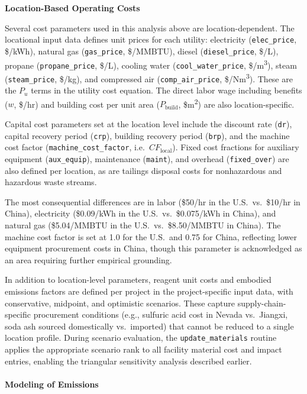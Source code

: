 \medskip
\noindent\textbf{Location-Based Operating Costs}\quad

Several cost parameters used in this analysis above are location-dependent. The locational input data defines unit prices for each utility: electricity (\texttt{elec\_price}, \$/kWh), natural gas (\texttt{gas\_price}, \$/MMBTU), diesel (\texttt{diesel\_price}, \$/L), propane (\texttt{propane\_price}, \$/L), cooling water (\texttt{cool\_water\_price}, \$/\si{m^3}), steam (\texttt{steam\_price}, \$/kg), and compressed air (\texttt{comp\_air\_price}, \$/\si{Nm^3}). These are the $P_u$ terms in the utility cost equation. The direct labor wage including benefits ($w$, \$/hr) and building cost per unit area ($P_{\text{build}}$, \$\si{m^2}) are also location-specific.

Capital cost parameters set at the location level include the discount rate (\texttt{dr}), capital recovery period (\texttt{crp}), building recovery period (\texttt{brp}), and the machine cost factor (\texttt{machine\_cost\_factor}, i.e.\ $CF_{\text{local}}$). Fixed cost fractions for auxiliary equipment (\texttt{aux\_equip}), maintenance (\texttt{maint}), and overhead (\texttt{fixed\_over}) are also defined per location, as are tailings disposal costs for nonhazardous and hazardous waste streams.

The most consequential differences are in labor (\$50/hr in the U.S.\ vs.\ \$10/hr in China), electricity (\$0.09/kWh in the U.S.\ vs.\ \$0.075/kWh in China), and natural gas (\$5.04/MMBTU in the U.S.\ vs.\ \$8.50/MMBTU in China). The machine cost factor is set at 1.0 for the U.S.\ and 0.75 for China, reflecting lower equipment procurement costs in China, though this parameter is acknowledged as an area requiring further empirical grounding.

In addition to location-level parameters, reagent unit costs and embodied emissions factors are defined per project in the project-specific input data, with conservative, midpoint, and optimistic scenarios. These capture supply-chain-specific procurement conditions (e.g., sulfuric acid cost in Nevada vs.\ Jiangxi, soda ash sourced domestically vs.\ imported) that cannot be reduced to a single location profile. During scenario evaluation, the \texttt{update\_materials} routine applies the appropriate scenario rank to all facility material cost and impact entries, enabling the triangular sensitivity analysis described earlier.

\paragraph{Modeling of Emissions}\label{app:04-methods-system-emissions}


